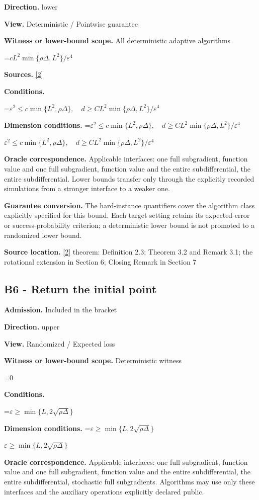 \documentclass[10pt,a4paper]{article}
\newcommand{\AtlasMath}[1]{\par\begingroup\centering\setbox0=\hbox{$\displaystyle #1$}\ifdim\wd0>1.4\linewidth\typeout{ATLAS WIDE FORMULA: \the\wd0}\fi\ifdim\wd0>\linewidth\resizebox{\linewidth}{!}{\box0}\else\box0\fi\par\endgroup}
\newcommand{\AtlasInlineMath}[1]{\begingroup\setbox0=\hbox{$#1$}\ifdim\wd0>.4\linewidth\endgroup\AtlasMath{#1}\else\endgroup$#1$\fi}
\begin{document}
\textbf{Direction.} lower

\textbf{View.} Deterministic / Pointwise guarantee

\textbf{Witness or lower-bound scope.} All deterministic adaptive algorithms

\AtlasMath{cL^2\min\{\rho\Delta,L^2\}/\varepsilon^4}
\textbf{Sources.} \href{https://arxiv.org/pdf/2608.03246}{[2]}

\textbf{Conditions.} 
\AtlasMath{\varepsilon^2\le c\min\{L^2,\rho\Delta\},\quad d\ge C L^2\min\{\rho\Delta,L^2\}/\varepsilon^4}


\textbf{Dimension conditions.} \AtlasInlineMath{\varepsilon^2\le c\min\{L^2,\rho\Delta\},\quad d\ge C L^2\min\{\rho\Delta,L^2\}/\varepsilon^4}

\textbf{Oracle correspondence.} Applicable interfaces: one full subgradient, function value and one full subgradient, function value and the entire subdifferential, the entire subdifferential. Lower bounds transfer only through the explicitly recorded simulations from a stronger interface to a weaker one.

\textbf{Guarantee conversion.} The hard-instance quantifiers cover the algorithm class explicitly specified for this bound. Each target setting retains its expected-error or success-probability criterion; a deterministic lower bound is not promoted to a randomized lower bound.

\textbf{Source location.} \href{https://arxiv.org/pdf/2608.03246}{[2]} theorem: Definition 2.3; Theorem 3.2 and Remark 3.1; the rotational extension in Section 6; Closing Remark in Section 7

\subsection{B6 - Return the initial point}
\textbf{Admission.} Included in the bracket

\textbf{Direction.} upper

\textbf{View.} Randomized / Expected loss

\textbf{Witness or lower-bound scope.} Deterministic witness

\AtlasMath{0}
\textbf{Conditions.} 
\AtlasMath{\varepsilon\ge\min\{L,2\sqrt{\rho\Delta}\}}


\textbf{Dimension conditions.} \AtlasInlineMath{\varepsilon\ge\min\{L,2\sqrt{\rho\Delta}\}}

\textbf{Oracle correspondence.} Applicable interfaces: one full subgradient, function value and one full subgradient, function value and the entire subdifferential, the entire subdifferential, stochastic full subgradients. Algorithms may use only these interfaces and the auxiliary operations explicitly declared public.
\end{document}

